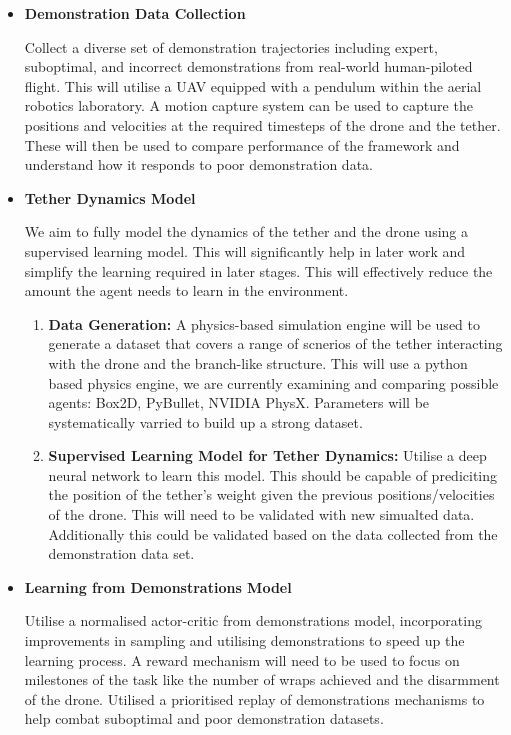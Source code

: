 \begin{itemize}
  \item \textbf{Demonstration Data Collection}
  
  Collect a diverse set of demonstration trajectories including expert, suboptimal, and incorrect demonstrations from real-world human-piloted flight.
  This will utilise a UAV equipped with a pendulum within the aerial robotics laboratory.
  A motion capture system can be used to capture the positions and velocities at the required timesteps of the drone and the tether.
  These will then be used to compare performance of the framework and understand how it responds to poor demonstration data.

  \item \textbf{Tether Dynamics Model}
  
  We aim to fully model the dynamics of the tether and the drone using a supervised learning model.
  This will significantly help in later work and simplify the learning required in later stages.
  This will effectively reduce the amount the agent needs to learn in the environment.

  \begin{enumerate}
    \item \textbf{Data Generation: } 
    A physics-based simulation engine will be used to generate a dataset that covers a range of scnerios of the tether interacting with the drone and the branch-like structure.
    This will use a python based physics engine, we are currently examining and comparing possible agents: Box2D, PyBullet, NVIDIA PhysX.
    Parameters will be systematically varried to build up a strong dataset.

    \item \textbf{Supervised Learning Model for Tether Dynamics: }
    Utilise a deep neural network to learn this model.
    This should be capable of prediciting the position of the tether's weight given the previous positions/velocities of the drone.
    This will need to be validated with new simualted data.
    Additionally this could be validated based on the data collected from the demonstration data set.
  \end{enumerate}

  \item \textbf{Learning from Demonstrations Model}
  
  Utilise a normalised actor-critic from demonstrations model, incorporating improvements in sampling and utilising demonstrations to speed up the learning process.
  A reward mechanism will need to be used to focus on milestones of the task like the number of wraps achieved and the disarmment of the drone.
  Utilised a prioritised replay of demonstrations mechanisms to help combat suboptimal and poor demonstration datasets.


\end{itemize}
